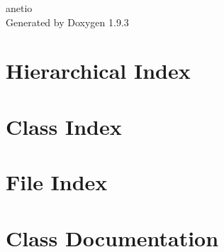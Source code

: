 \documentclass[twoside]{book}
\newcommand{\+}{\discretionary{\mbox{\scriptsize$\hookleftarrow$}}{}{}}
\newcommand{\clearemptydoublepage}{%
    \newpage{\pagestyle{empty}\cleardoublepage}%
  }
\begin{document}
  \raggedbottom
    \hypersetup{pageanchor=false,
                bookmarksnumbered=true,
                pdfencoding=unicode
               }
  \begin{titlepage}
  \vspace*{7cm}
  \begin{center}%
  {\Large anetio}\\
  \vspace*{1cm}
  {\large Generated by Doxygen 1.9.3}\\
  \end{center}
  \end{titlepage}
  \clearemptydoublepage
  \tableofcontents
  \clearemptydoublepage
  \hypersetup{pageanchor=true}
\chapter{Hierarchical Index}

\chapter{Class Index}

\chapter{File Index}

\chapter{Class Documentation}


























\end{document}
